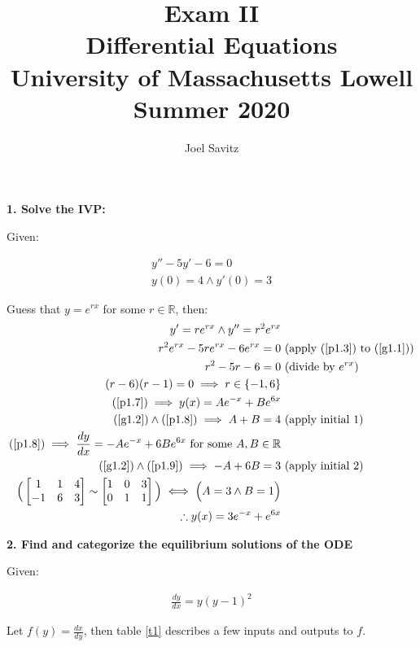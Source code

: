 \documentclass[12pt]{article}
\title{Exam II \\
\small Differential Equations \\
University of Massachusetts Lowell \\
Summer 2020}
\author{Joel Savitz}
\newcommand{\reals}{\mathbb{R}}
\begin{document}
\maketitle

\textbf{1. Solve the IVP:}

Given:

\begin{align}
	\label{g1.1}
	y'' - 5y' -6 = 0 \\
	\label{g1.2}
	y(0) = 4 \land y'(0) = 3
\end{align}

Guess that $y = e^{rx}$ for some $r \in \reals$, then:
\begin{align}
	\label{p1.3}
	y' = re^{rx} \land y'' = r^2e^{rx} & \\
	r^2e^{rx}-5re^{rx}-6e^{rx} = 0 & \textrm{ (apply (\ref{p1.3}) to (\ref{g1.1})}) \\
	r^2-5r-6 = 0 & \textrm{ (divide by $e^{rx}$)} \\
	\label{p1.7}
	(r-6)(r-1) = 0 \implies r \in \{ -1, 6 \} & \\
	\label{p1.8}
	(\ref{p1.7}) \implies y(x) = Ae^{-x} + Be^{6x} \\
	(\ref{g1.2}) \land (\ref{p1.8}) \implies A + B = 4 & \textrm{ (apply initial 1)}\\
	\label{p1.9}
	(\ref{p1.8}) \implies \frac{dy}{dx} = -Ae^{-x} + 6Be^{6x} \textrm{ for some } A,B \in \reals \\
	(\ref{g1.2}) \land (\ref{p1.9}) \implies -A + 6B = 3 & \textrm{ (apply initial 2)}\\
	\Big(\begin{bmatrix} 1 & 1 & 4 \\ -1 & 6 & 3 \end{bmatrix} \sim
	\begin{bmatrix} 1 & 0 & 3 \\ 0 & 1 & 1 \end{bmatrix} \Big)
	\iff \Big(A = 3 \land B = 1 \Big) \\
	\label{s1}
	\therefore y(x) = 3e^{-x} + e^{6x}
\end{align}

\pagebreak

\textbf{2. Find and categorize the equilibrium solutions of the ODE}

Given:

\begin{align}
	\label{g2}
	\frac{dy}{dx} = y(y - 1)^2
\end{align}

Let $f(y) = \frac{dx}{dy}$, then table \ref{t1} describes a few inputs and outputs to $f$.
\end{document}
